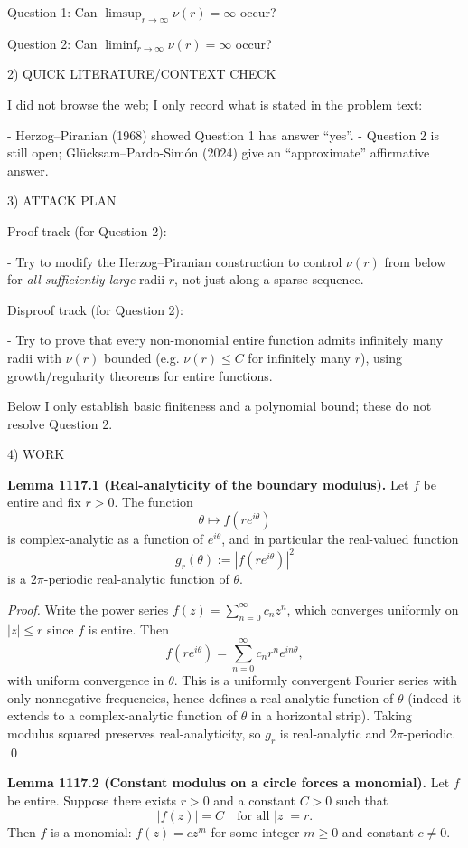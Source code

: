Question 1: Can \(\limsup_{r\to\infty} \nu(r)=\infty\) occur?

Question 2: Can \(\liminf_{r\to\infty} \nu(r)=\infty\) occur?

2) QUICK LITERATURE/CONTEXT CHECK

I did not browse the web; I only record what is stated in the problem text:

- Herzog--Piranian (1968) showed Question 1 has answer ``yes''.
- Question 2 is still open; Gl\"ucksam--Pardo-Sim\'on (2024) give an ``approximate'' affirmative answer.

3) ATTACK PLAN

Proof track (for Question 2):

- Try to modify the Herzog--Piranian construction to control \(\nu(r)\) from below for \emph{all sufficiently large} radii \(r\), not just along a sparse sequence.

Disproof track (for Question 2):

- Try to prove that every non-monomial entire function admits infinitely many radii with \(\nu(r)\) bounded (e.g. \(\nu(r)\le C\) for infinitely many \(r\)), using growth/regularity theorems for entire functions.

Below I only establish basic finiteness and a polynomial bound; these do not resolve Question 2.

4) WORK

\textbf{Lemma 1117.1 (Real-analyticity of the boundary modulus).}
Let \(f\) be entire and fix \(r>0\). The function
\[
\theta\mapsto f(r e^{i\theta})
\]
is complex-analytic as a function of \(e^{i\theta}\), and in particular the real-valued function
\[
 g_r(\theta):=|f(r e^{i\theta})|^2
\]
is a \(2\pi\)-periodic real-analytic function of \(\theta\).

\emph{Proof.}
Write the power series \(f(z)=\sum_{n=0}^\infty c_n z^n\), which converges uniformly on \(|z|\le r\) since \(f\) is entire. Then
\[
 f(r e^{i\theta}) = \sum_{n=0}^\infty c_n r^n e^{i n\theta},
\]
with uniform convergence in \(\theta\). This is a uniformly convergent Fourier series with only nonnegative frequencies, hence defines a real-analytic function of \(\theta\) (indeed it extends to a complex-analytic function of \(\theta\) in a horizontal strip). Taking modulus squared preserves real-analyticity, so \(g_r\) is real-analytic and \(2\pi\)-periodic. \qed

\textbf{Lemma 1117.2 (Constant modulus on a circle forces a monomial).}
Let \(f\) be entire. Suppose there exists \(r>0\) and a constant \(C>0\) such that
\[
|f(z)|=C\quad\text{for all }|z|=r.
\]
Then \(f\) is a monomial: \(f(z)=c z^m\) for some integer \(m\ge 0\) and constant \(c\ne 0\).

